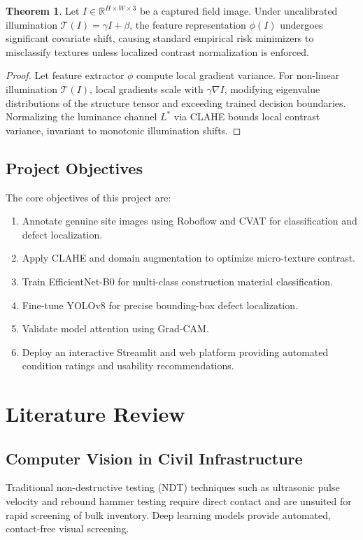 \documentclass[12pt,a4paper]{report}
\theoremstyle{definition}
\newtheorem{theorem}{Theorem}[section]
\begin{document}
\begin{theorem}
Let $I \in \mathbb{R}^{H \times W \times 3}$ be a captured field image. Under uncalibrated illumination $\mathcal{T}(I) = \gamma I + \beta$, the feature representation $\phi(I)$ undergoes significant covariate shift, causing standard empirical risk minimizers to misclassify textures unless localized contrast normalization is enforced.
\end{theorem}

\begin{proof}
Let feature extractor $\phi$ compute local gradient variance. For non-linear illumination $\mathcal{T}(I)$, local gradients scale with $\gamma \nabla I$, modifying eigenvalue distributions of the structure tensor and exceeding trained decision boundaries. Normalizing the luminance channel $L^*$ via CLAHE bounds local contrast variance, invariant to monotonic illumination shifts.
\end{proof}

\section{Project Objectives}
The core objectives of this project are:
\begin{enumerate}
    \item Annotate genuine site images using Roboflow and CVAT for classification and defect localization.
    \item Apply CLAHE and domain augmentation to optimize micro-texture contrast.
    \item Train EfficientNet-B0 for multi-class construction material classification.
    \item Fine-tune YOLOv8 for precise bounding-box defect localization.
    \item Validate model attention using Grad-CAM.
    \item Deploy an interactive Streamlit and web platform providing automated condition ratings and usability recommendations.
\end{enumerate}

\chapter{Literature Review}
\section{Computer Vision in Civil Infrastructure}
Traditional non-destructive testing (NDT) techniques such as ultrasonic pulse velocity and rebound hammer testing require direct contact and are unsuited for rapid screening of bulk inventory. Deep learning models provide automated, contact-free visual screening.
\end{document}

